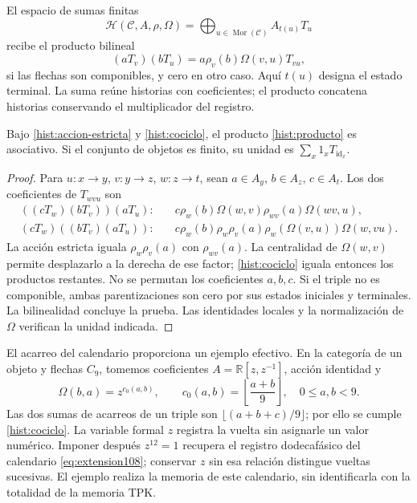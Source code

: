 El espacio de sumas finitas
\[
 \mathcal H(\mathcal C,A,\rho,\Omega)
   =\bigoplus_{u\in\operatorname{Mor}(\mathcal C)} A_{t(u)}T_u
\]
recibe el producto bilineal
\begin{equation}
 (aT_v)(bT_u)=a\rho_v(b)\Omega(v,u)T_{vu},
 \label{hist:producto}
\end{equation}
si las flechas son componibles, y cero en otro caso. Aquí \(t(u)\)
designa el estado terminal. La suma reúne historias con coeficientes; el
producto concatena historias conservando el multiplicador del registro.

\begin{proposition}
Bajo \eqref{hist:accion-estricta} y \eqref{hist:cociclo}, el producto
\eqref{hist:producto} es asociativo. Si el conjunto de objetos es finito,
su unidad es \(\sum_x1_xT_{\operatorname{id}_x}\).
\end{proposition}
\begin{proof}
Para \(u:x\to y\), \(v:y\to z\), \(w:z\to t\), sean
\(a\in A_y\), \(b\in A_z\), \(c\in A_t\). Los dos coeficientes
de \(T_{wvu}\) son
\begin{align*}
 ((cT_w)(bT_v))(aT_u):\quad&
 c\rho_w(b)\Omega(w,v)\rho_{wv}(a)\Omega(wv,u),\\
 (cT_w)((bT_v)(aT_u)):\quad&
 c\rho_w(b)\rho_w\rho_v(a)\rho_w(\Omega(v,u))\Omega(w,vu).
\end{align*}
La acción estricta iguala \(\rho_w\rho_v(a)\) con \(\rho_{wv}(a)\).
La centralidad de \(\Omega(w,v)\) permite desplazarlo a la derecha de
ese factor; \eqref{hist:cociclo} iguala entonces los productos restantes.
No se permutan los coeficientes \(a,b,c\). Si el triple no es componible,
ambas parentizaciones son cero por sus estados iniciales y terminales.
La bilinealidad concluye la prueba. Las identidades locales y la
normalización de \(\Omega\) verifican la unidad indicada.
\end{proof}

El acarreo del calendario proporciona un ejemplo efectivo. En la categoría
de un objeto y flechas \(C_9\), tomemos coeficientes
\(A=\mathbb R[z,z^{-1}]\), acción identidad y
\[
 \Omega(b,a)=z^{c_0(a,b)},\qquad
 c_0(a,b)=\left\lfloor\frac{a+b}{9}\right\rfloor,
 \quad 0\leq a,b<9.
\]
Las dos sumas de acarreos de un triple son
\(\lfloor(a+b+c)/9\rfloor\); por ello se cumple
\eqref{hist:cociclo}. La variable formal \(z\) registra la vuelta sin
asignarle un valor numérico. Imponer después \(z^{12}=1\) recupera el
registro dodecafásico del calendario \eqref{eq:extension108}; conservar
\(z\) sin esa relación distingue vueltas sucesivas. El ejemplo realiza
la memoria de este calendario, sin identificarla con la totalidad de la
memoria TPK.

